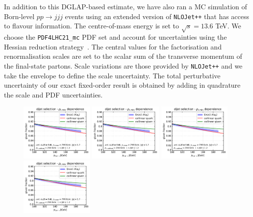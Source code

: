 \documentclass[a4paper,11pt]{article}
\begin{document}
In addition to this DGLAP-based estimate, we have also ran a MC simulation of Born-level $pp\to jjj$ events using an extended version of \texttt{NLOJet++} that has access to flavour information. The centre-of-mass energy is set to $\sqrt{s}=13.6$ TeV. We choose the \texttt{PDF4LHC21\_mc} PDF set and account for uncertainties using the Hessian reduction strategy~\cite{PDF4LHCWorkingGroup:2022cjn}. The central values for the factorisation and renormalisation scales are set to the scalar sum of the transverse momentum of the final-state partons. Scale variations are those provided by \texttt{NLOJet++} and we take the envelope to define the scale uncertainty. The total perturbative uncertainty of our exact fixed-order result is obtained by adding in quadrature the scale and PDF uncertainties. 

\begin{figure}
    \centering
  \includegraphics[page=4,width=0.32\textwidth]{born-fractions.pdf}
 \includegraphics[page=5,width=0.32\textwidth]{born-fractions.pdf}
 \includegraphics[page=6,width=0.32\textwidth]{born-fractions.pdf} \\
     \includegraphics[page=1,width=0.32\textwidth]{born-fractions.pdf}

\end{figure}
\end{document}
